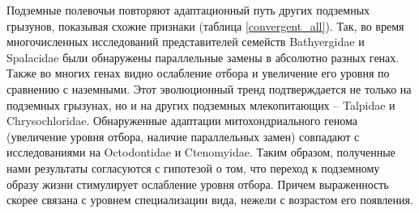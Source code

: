  Подземные полевочьи повторяют адаптационный путь других подземных грызунов, показывая схожие признаки (таблица \ref{convergent_all}). Так, во время многочисленных исследований представителей семейств Bathyergidae и  Spalacidae были обнаружены параллельные замены в абсолютно разных генах. Также во многих генах видно ослабление отбора и увеличение его уровня по сравнению с наземными. Этот эволюционный тренд подтверждается не только на подземных грызунах, но и на других подземных млекопитающих --  Talpidae и Chrysochloridae. Обнаруженные адаптации митохондриального генома (увеличение уровня отбора, наличие параллельных замен) совпадают с исследованиями на Octodontidae и Ctenomyidae. Таким образом, полученные нами результаты согласуются с гипотезой о том, что переход к подземному образу жизни стимулирует ослабление уровня отбора. Причем выраженность скорее связана с уровнем специализации вида, нежели с возрастом его появления.


%	
%		
%	

